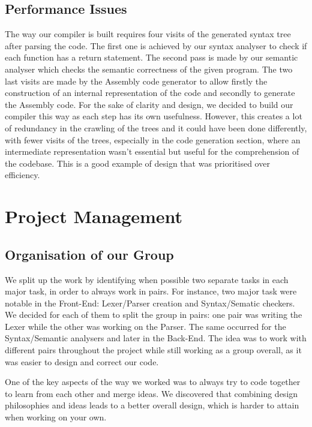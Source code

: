 \documentclass[a4wide, 11pt]{article}
\begin{document}
\subsection{Performance Issues}

The way our compiler is built requires four visits of the generated syntax tree after parsing the code. The first one is achieved by our syntax analyser to check if each function has a return statement. The second pass is made by our semantic analyser which checks the semantic correctness of the given program. The two last visits are made by the Assembly code generator to allow firstly the construction of an internal representation of the code and secondly to generate the Assembly code. For the sake of clarity and design, we decided to build our compiler this way as each step has its own usefulness. However, this creates a lot of redundancy in the crawling of the trees and it could have been done differently, with fewer visits of the trees, especially in the code generation section, where an intermediate representation wasn’t essential but useful for the comprehension of the codebase. This is a good example of design that was prioritised over efficiency.



\section{Project Management}

\subsection{Organisation of our Group}

We split up the work by identifying when possible two separate tasks in each major task, in order to always work in pairs. For instance, two major task were notable in the Front-End: Lexer/Parser creation and Syntax/Sematic checkers. We decided for each of them to split the group in pairs: one pair was writing the Lexer while the other was working on the Parser. The same occurred for the Syntax/Semantic analysers and later in the Back-End. The idea was to work with different pairs throughout the project while still working as a group overall, as it was easier to design and correct our code.

\bigskip

One of the key aspects of the way we worked was to always try to code together to learn from each other and merge ideas. We discovered that combining design philosophies and ideas leads to a better overall design, which is harder to attain when working on your own.
\end{document}
